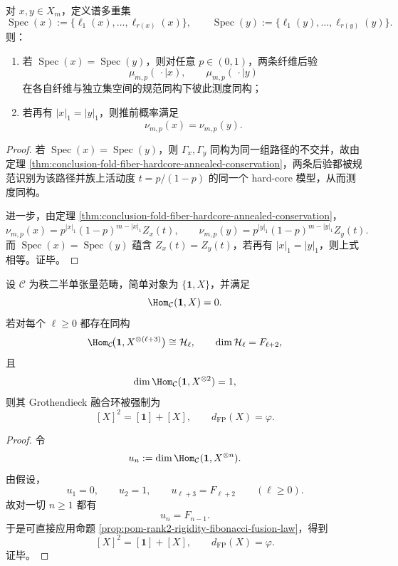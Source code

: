 \begin{corollary}\label{cor:conclusion-fiber-bernoulli-posterior-statistical-isomorphism}
对 \(x,y\in X_m\)，定义谱多重集
\[
\operatorname{Spec}(x):=\{\ell_1(x),\dots,\ell_{r(x)}(x)\},
\qquad
\operatorname{Spec}(y):=\{\ell_1(y),\dots,\ell_{r(y)}(y)\}.
\]
则：
\begin{enumerate}
  \item 若 \(\operatorname{Spec}(x)=\operatorname{Spec}(y)\)，则对任意 \(p\in(0,1)\)，两条纤维后验
  \[
  \mu_{m,p}(\,\cdot\mid x),
  \qquad
  \mu_{m,p}(\,\cdot\mid y)
  \]
  在各自纤维与独立集空间的规范同构下彼此测度同构；
  \item 若再有 \(|x|_1=|y|_1\)，则推前概率满足
  \[
  \nu_{m,p}(x)=\nu_{m,p}(y).
  \]
\end{enumerate}
\end{corollary}
\begin{proof}
若 \(\operatorname{Spec}(x)=\operatorname{Spec}(y)\)，则 \(\Gamma_x,\Gamma_y\) 同构为同一组路径的不交并，故由定理 \ref{thm:conclusion-fold-fiber-hardcore-annealed-conservation}，两条后验都被规范识别为该路径并族上活动度 \(t=p/(1-p)\) 的同一个 hard-core 模型，从而测度同构。

进一步，由定理 \ref{thm:conclusion-fold-fiber-hardcore-annealed-conservation}，
\[
\nu_{m,p}(x)=p^{|x|_1}(1-p)^{m-|x|_1}Z_x(t),
\qquad
\nu_{m,p}(y)=p^{|y|_1}(1-p)^{m-|y|_1}Z_y(t).
\]
而 \(\operatorname{Spec}(x)=\operatorname{Spec}(y)\) 蕴含 \(Z_x(t)=Z_y(t)\)，若再有 \(|x|_1=|y|_1\)，则上式相等。证毕。
\end{proof}

\begin{theorem}\label{thm:conclusion-single-component-fiber-reverse-fibonacci-fusion-rigidity}
设 \(\mathcal C\) 为秩二半单张量范畴，简单对象为 \(\{\mathbf 1,X\}\)，并满足
\[
\Hom_{\mathcal C}(\mathbf 1,X)=0.
\]
若对每个 \(\ell\ge 0\) 都存在同构
\[
\Hom_{\mathcal C}\!\bigl(\mathbf 1,X^{\otimes(\ell+3)}\bigr)\cong \mathcal H_\ell,
\qquad
\dim \mathcal H_\ell=F_{\ell+2},
\]
且
\[
\dim\Hom_{\mathcal C}(\mathbf 1,X^{\otimes 2})=1,
\]
则其 Grothendieck 融合环被强制为
\[
[X]^2=[\mathbf 1]+[X],
\qquad
d_{\mathrm{FP}}(X)=\varphi.
\]
\end{theorem}
\begin{proof}
令
\[
u_n:=\dim\Hom_{\mathcal C}(\mathbf 1,X^{\otimes n}).
\]
由假设，
\[
u_1=0,
\qquad
u_2=1,
\qquad
u_{\ell+3}=F_{\ell+2}\qquad (\ell\ge 0).
\]
故对一切 \(n\ge 1\) 都有
\[
u_n=F_{n-1}.
\]
于是可直接应用命题 \ref{prop:pom-rank2-rigidity-fibonacci-fusion-law}，得到
\[
[X]^2=[\mathbf 1]+[X],
\qquad
d_{\mathrm{FP}}(X)=\varphi.
\]
证毕。
\end{proof}

